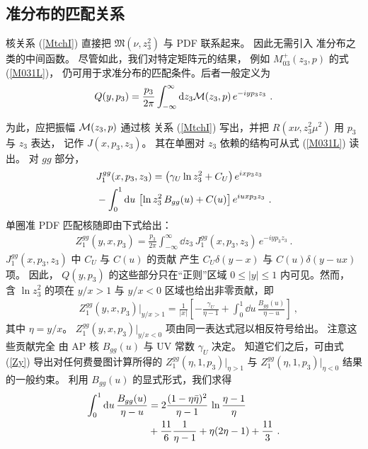 \subsection{准分布的匹配关系}

核关系 (\ref{MtchI}) 直接把 ${\mathfrak M}(\nu,z_3^2)$
与 PDF 联系起来。
因此无需引入
准分布之类的中间函数。
尽管如此，我们对特定矩阵元的结果，
例如 $M_{03} ^+(z_3,p)$ 的式 (\ref{M031L})，
仍可用于求准分布的匹配条件。后者一般定义为 \cite{Ji:2013dva}
\begin{align}
Q(y, p_3) = \frac{p_3}{2 \pi}
\int_{-\infty}^\infty \mathrm{d} z_3
{\cal M} (z_3, p) \, e^{-i y p_3 z_3} \
.
\label{qPDF}
\end{align}

为此，应把振幅 ${\cal M} (z_3, p)$ 通过核
关系 (\ref{MtchI}) 写出，并把 $R(x \nu, z_3^2 \mu^2 )$ 用 $p_3$ 与 $z_3$ 表达，
记作 $J(x, p_3, z_3)$。
其在单圈对 $z_3$ 依赖的结构可从式 (\ref{M031L}) 读出。
对 $gg$ 部分，
\begin{align}
& J_1^{gg} (x, p_3, z_3)= \left (\gamma_U \ln z_3^2 +C_U \right) e^{ix p_3 z_3}
\nonumber \\  & - \int_0^1 \mathrm{d} u \,\left [ \ln z_3^2 \, B_{gg} (u)
+C (u) \right ]e^{iu x p_3 z_3} \ .
\label{Jk}
\end{align}
单圈准 PDF 匹配核随即由下式给出：
\begin{align}
Z_1^{gg} (y, x, p_3) = \frac{p_3}{2 \pi}
\int_{-\infty}^\infty \dd z_3 \, J_1^{gg} (x, p_3, z_3)
\, e^{-i y p_3 z_3} \
.
\label{qZ}
\end{align}
$J_1^{gg} (x, p_3, z_3)$ 中 $C_U$ 与 $C(u)$ 的贡献
产生 \mbox{$C_U \delta (y- x)$} 与 $C (u)\delta (y - u x )$ 项。
因此，
$Q(y,p_3)$ 的这些部分只在``正则''区域 $0\leq |y| \leq 1$ 内可见。然而，
含 $\ln z_3^2$ 的项在 $y/x>1$
与 $y/x<0$ 区域也给出非零贡献，即
\begin{align}
& \, Z_1^{gg} (y, x, p_3) |_{y/x>1} = \frac1{|x|} \left [- \frac{\gamma_U}{\eta -1}
+ \int_0^1 \dd u \, \frac{B_{gg} (u)}{\eta-u} \right ]
\ ,
\label{Zy}
\end{align}
其中 $\eta= y/x$。
$Z_1^{gg} (y, x, p_3) |_{y/x<0}$ 项由同一表达式冠以相反符号给出。
注意这些贡献完全
由 AP 核 $B_{gg} (u)$ 与 UV 常数
$\gamma_U$ 决定。
知道它们之后，可由式 (\ref{Zy}) 导出对任何费曼图计算所得的
$Z_1^{gg} (\eta, 1, p_3) |_{\eta>1}$
与 $Z_1^{gg} (\eta, 1, p_3) |_{\eta<0}$
结果的一般约束。
利用 $B_{gg} (u)$ 的显式形式，我们求得
\begin{align}
\int_0^1 \mathrm{d} u \, \frac{B_{gg} (u) }{\eta-u} & = 2 \frac{(1-\eta \bar \eta)^2}{\eta -1} \, \ln \frac{\eta-1}{\eta}
\nonumber \\  & + \frac{11}{6} \frac{1}{\eta -1} + \eta (2 \eta -1) +\frac{11}{3}
\ .
\label{ZB}
\end{align}

